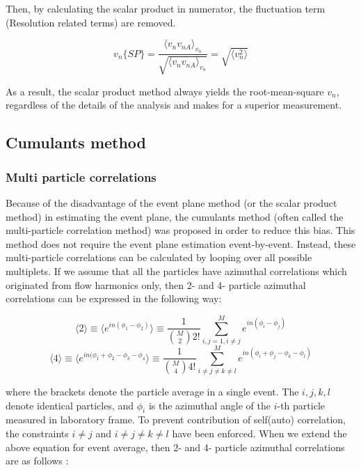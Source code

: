 		Then, by calculating the scalar product in numerator, the fluctuation term (Resolution related terms) are removed. 
		
	\begin{equation}
		v_n\{SP\} = \frac{\langle v_n v_{nA} \rangle _{v_n} }{\sqrt{\langle v_n v_{nA} \rangle _{v_n}}} = \sqrt{\langle v_n^2 \rangle }
	\end{equation}	
	\smallskip
	
	As a result, the scalar product method always yields the root-mean-square $v_n$, regardless of the details of the analysis and makes for a superior measurement. 
	
\subsection{Cumulants method}

\subsubsection{Multi particle correlations}

Because of the disadvantage of the event plane method (or the scalar product method) in estimating the event plane, the cumulants method (often called the multi-particle correlation method) was proposed in order to reduce this bias. This method does not require the event plane estimation event-by-event. Instead, these multi-particle correlations can be calculated by looping over all possible multiplets. If we assume that all the particles have azimuthal correlations which originated from flow harmonics only, then 2- and 4- particle azimuthal correlations can be expressed in the following way:
	
\begin{equation}
	\langle 2 \rangle \equiv  \langle e^{in(\phi_1 - \phi_2)} \rangle \equiv \frac{1}{{M \choose 2}2!}\sum_{i,j=1, i\neq j}^{M}{e^{in(\phi_i - \phi_j)}}
\end{equation}
\begin{equation}
	\langle 4 \rangle \equiv \langle e^{in(\phi_1 + \phi_2 - \phi_3 - \phi_4} \rangle \equiv \frac{1}{{M \choose 4}4!}\sum^{M}_{i\neq j\neq k \neq l}e^{in(\phi_i + \phi_j - \phi_k - \phi_l)}
\end{equation}
\smallskip

where the brackets denote the particle average in a single event. The $i, j, k, l$ denote identical particles, and $\phi_i$ is the azimuthal angle of the $i$-th particle measured in laboratory frame. To prevent contribution of self(auto) correlation, the constraints $i \neq j$ and $i \neq j \neq k \neq l$ have been enforced. When we extend the above equation for event average, then 2- and 4- particle azimuthal correlations are as follows :

